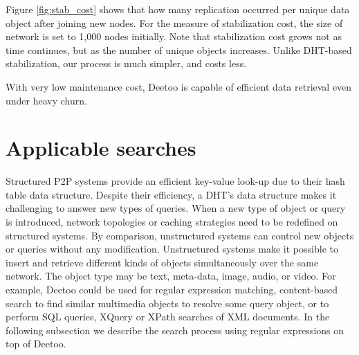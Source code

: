 Figure \ref{fig:stab_cost} shows that how many replication occurred per unique
data object after joining new nodes. 
For the measure of stabilization cost, 
the size of network is set to 1,000 nodes initially. 
Note that stabilization cost grows not as time continues, but as the number of unique 
objects increases.
Unlike DHT-based stabilization, our process is much simpler, and costs less.

With very low maintenance cost, Deetoo is capable of efficient data retrieval 
even under heavy churn.

\section{Applicable searches}
Structured P2P systems provide an efficient key-value look-up due to 
their hash table data structure.
Despite their efficiency, a DHT's data structure makes it challenging to answer new
types of queries.
When a new type of object or query is introduced, network topologies or 
caching strategies need to be redefined on structured systems. By comparison, 
unstructured systems can control new objects or queries without any modification. 
Unstructured systems make it possible to insert and retrieve 
different kinds of objects simultaneously over the same network.
The object type may be text, meta-data, image, audio, or video.
For example, Deetoo could be used for regular expression
matching, content-based search to find similar multimedia objects to
resolve some query object, or to perform SQL queries, XQuery or XPath searches of XML
documents. In the following subsection we describe the search process using 
regular expressions on top of Deetoo.
 
